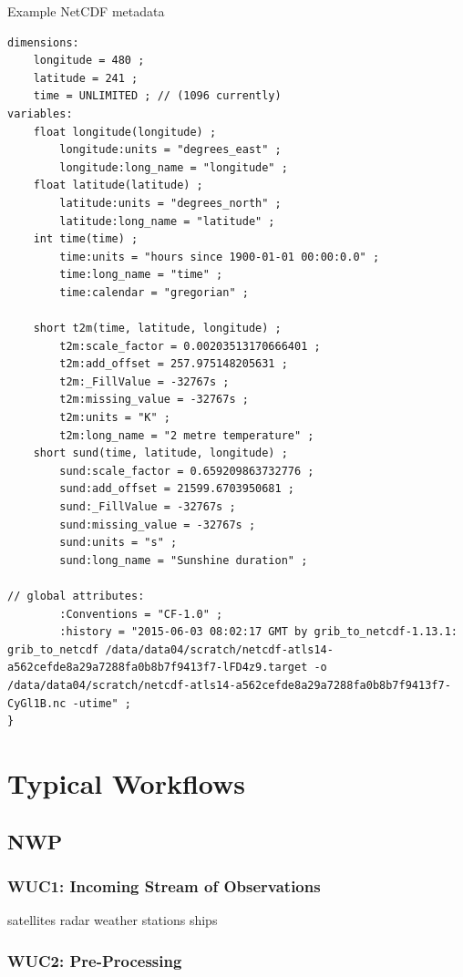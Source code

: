 \documentclass{../../template/esiwace-report}
\begin{document}
\begin{tcbcode}[label={lst:NetCDF-data}]{Example NetCDF metadata}
\begin{lstlisting}
dimensions:
	longitude = 480 ;
	latitude = 241 ;
	time = UNLIMITED ; // (1096 currently)
variables:
	float longitude(longitude) ;
		longitude:units = "degrees_east" ;
		longitude:long_name = "longitude" ;
	float latitude(latitude) ;
		latitude:units = "degrees_north" ;
		latitude:long_name = "latitude" ;
	int time(time) ;
		time:units = "hours since 1900-01-01 00:00:0.0" ;
		time:long_name = "time" ;
		time:calendar = "gregorian" ;

	short t2m(time, latitude, longitude) ;
		t2m:scale_factor = 0.00203513170666401 ;
		t2m:add_offset = 257.975148205631 ;
		t2m:_FillValue = -32767s ;
		t2m:missing_value = -32767s ;
		t2m:units = "K" ;
		t2m:long_name = "2 metre temperature" ;
	short sund(time, latitude, longitude) ;
		sund:scale_factor = 0.659209863732776 ;
		sund:add_offset = 21599.6703950681 ;
		sund:_FillValue = -32767s ;
		sund:missing_value = -32767s ;
		sund:units = "s" ;
		sund:long_name = "Sunshine duration" ;

// global attributes:
		:Conventions = "CF-1.0" ;
		:history = "2015-06-03 08:02:17 GMT by grib_to_netcdf-1.13.1: grib_to_netcdf /data/data04/scratch/netcdf-atls14-a562cefde8a29a7288fa0b8b7f9413f7-lFD4z9.target -o /data/data04/scratch/netcdf-atls14-a562cefde8a29a7288fa0b8b7f9413f7-CyGl1B.nc -utime" ;
}
\end{lstlisting}
\end{tcbcode}



\newpage
\section{Typical Workflows}

\subsection{NWP}






\subsubsection{WUC1: Incoming Stream of Observations}

satellites
radar
weather stations
ships

\subsubsection{WUC2: Pre-Processing}
\end{document}
